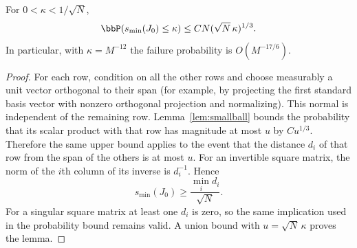 \documentclass[11pt,reqno]{amsart}
\begin{document}
\begin{lem}\label{lem:singular}
For $0<\kappa<1/\sqrt N$,
\[
 \bbP(s_{\min}(J_0)\le\kappa)\le CN(\sqrt N\,\kappa)^{1/3}.
\]
In particular, with $\kappa=M^{-12}$ the failure probability is $O(M^{-17/6})$.
\end{lem}

\begin{proof}
For each row, condition on all the other rows and choose measurably a unit vector orthogonal to their span (for example, by projecting the first standard basis vector with nonzero orthogonal projection and normalizing). This normal is independent of the remaining row. Lemma~\ref{lem:smallball} bounds the probability that its scalar product with that row has magnitude at most $u$ by $Cu^{1/3}$. Therefore the same upper bound applies to the event that the distance $d_i$ of that row from the span of the others is at most $u$.
For an invertible square matrix, the norm of the $i$th column of its inverse is $d_i^{-1}$. Hence
\[
 s_{\min}(J_0)\ge\frac{\min_i d_i}{\sqrt N}.
\]
For a singular square matrix at least one $d_i$ is zero, so the same implication used in the probability bound remains valid. A union bound with $u=\sqrt N\,\kappa$ proves the lemma.
\end{proof}
\end{document}
